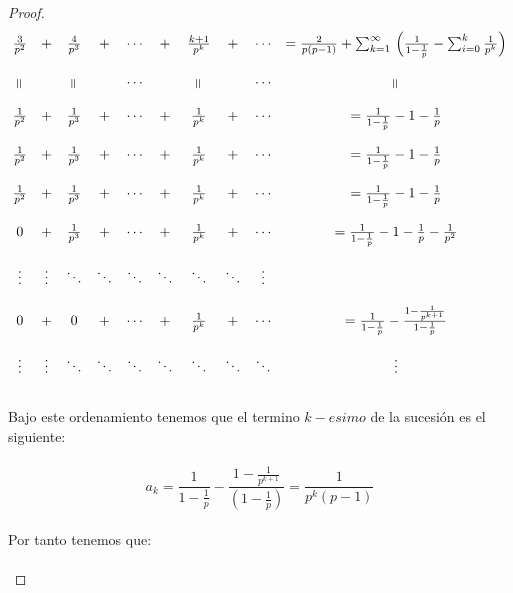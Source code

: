 \documentclass[11pt,letterpaper]{article}
\newcommand{\equalflipped}{\rotatebox[origin=c]{90}{$=$}}
\begin{document}
\begin{proof}
\,\\
\begin{equation*}
\begin{matrix}
    \frac{3}{p^2}&+&\frac{4}{p^3}&+&\cdots&+&\frac{k+1}{p^k}&+&\cdots&=\frac{2}{p(p-1)}+\sum_{k=1}^{\infty}\,\left(\frac{1}{1-\frac{1}{p}}-\sum_{i=0}^{k}\frac{1}{p^k}\right)\\
    \,\\
    \equalflipped& &\equalflipped& &\cdots& &\equalflipped& &\cdots&\equalflipped\\\
    \,\\
    \frac{1}{p^2}&+&\frac{1}{p^3}&+&\cdots&+&\frac{1}{p^k}&+&\cdots&=\frac{1}{1-\frac{1}{p}}-1-\frac{1}{p}\\
    \,\\
    \frac{1}{p^2}&+&\frac{1}{p^3}&+&\cdots&+&\frac{1}{p^k}&+&\cdots&=\frac{1}{1-\frac{1}{p}}-1-\frac{1}{p}\\
    \,\\
    \frac{1}{p^2}&+&\frac{1}{p^3}&+&\cdots&+&\frac{1}{p^k}&+&\cdots&=\frac{1}{1-\frac{1}{p}}-1-\frac{1}{p}\\
    \,\\
    0&+&\frac{1}{p^3}&+&\cdots&+&\frac{1}{p^k}&+&\cdots&=\frac{1}{1-\frac{1}{p}}-1-\frac{1}{p}-\frac{1}{p^2}\\
    \,\\
    \vdots & \vdots & \ddots & \ddots &\ddots &\ddots &\ddots &\ddots &\vdots\\
    \,\\
    0&+&0&+&\cdots&+& \frac{1}{p^k}&+&\cdots&=\frac{1}{1-\frac{1}{p}}-\frac{1-\frac{1}{p^{k+1}}}{1-\frac{1}{p}}\\
    \,\\
     \vdots & \vdots & \ddots & \ddots &\ddots &\ddots &\ddots &\ddots &\ddots  &\vdots\\
\end{matrix}
\end{equation*}\,\\
Bajo este ordenamiento tenemos que el termino $k-esimo$ de la sucesi\'on es el siguiente:\,\\
\,\\
\begin{equation*}
    a_k=\frac{1}{1-\frac{1}{p}}-\frac{1-\frac{1}{p^{k+1}}}{(1-\frac{1}{p})}=\frac{1}{p^k(p-1)}
\end{equation*}\,\\
Por tanto tenemos que:\,\\
\,\\
\begin{equation*}

\end{equation*}
\end{proof}
\end{document}
